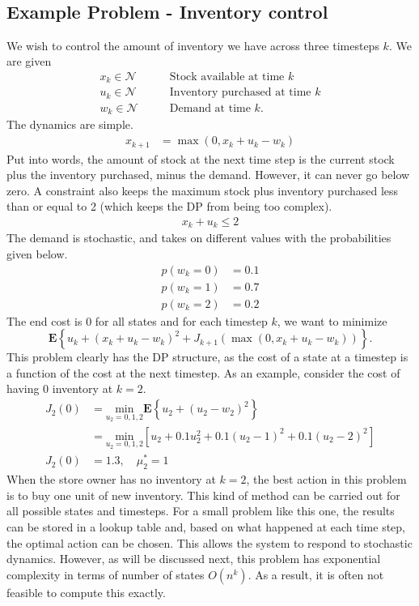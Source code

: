 \documentclass[twoside]{article}
\begin{document}
\\ \subsection{Example Problem - Inventory control}
We wish to control the amount of inventory we have across three timesteps $k$. We are given
\begin{align*}
    x_k\in\mathcal{N} &\qquad \text{Stock available at time }k\\
    u_k\in\mathcal{N} &\qquad \text{Inventory purchased at time }k\\
    w_k\in\mathcal{N} &\qquad \text{Demand at time }k.
\end{align*}
The dynamics are simple.
\begin{align*}
    x_{k+1} &= \max(0, x_k+u_k-w_k)
\end{align*}
Put into words, the amount of stock at the next time step is the current stock plus the inventory purchased, minus the demand. However, it can never go below zero. A constraint also keeps the maximum stock plus inventory purchased less than or equal to 2 (which keeps the DP from being too complex).
\begin{align*}
    x_k+u_k\leq 2
\end{align*}
The demand is stochastic, and takes on different values with the probabilities given below.
\begin{align*}
    p(w_k=0)&=0.1\\
    p(w_k=1)&=0.7\\
    p(w_k=2)&=0.2
\end{align*}
	The end cost is 0 for all states and for each timestep $k$, we want to minimize
	\[
	    \mathbf{E}\left\{ u_k+(x_k+u_k-w_k)^2+J_{k+1}(\max(0,x_k+u_k-w_k)) \right\}.
	\]
	This problem clearly has the DP structure, as the cost of a state at a timestep is a function of the cost at the next timestep. As an example, consider the cost of having 0 inventory at $k=2$.
	\begin{align*}
	    J_2(0) &= \underset{u_2=0,1,2}{\text{min}}\mathbf{E}\left\{ u_2+(u_2-w_2)^2 \right\}\\
	    &= \underset{u_2=0,1,2}{\text{min}}\left[ u_2+0.1u_2^2 +0.1(u_2-1)^2 +0.1(u_2-2)^2 \right]\\
	    J_2(0) &= 1.3, \quad \mu_2^*=1
	\end{align*}
When the store owner has no inventory at $k=2$, the best action in this problem is to buy one unit of new inventory. This kind of method can be carried out for all possible states and timesteps. For a small problem like this one, the results can be stored in a lookup table and, based on what happened at each time step, the optimal action can be chosen. This allows the system to respond to stochastic dynamics. However, as will be discussed next, this problem has exponential complexity in terms of number of states $O(n^k)$. As a result, it is often not feasible to compute this exactly. \\
\end{document}
